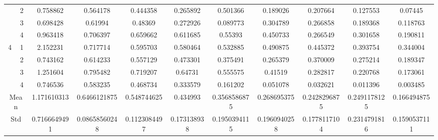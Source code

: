 \documentclass[draft,dvipsnames]{drexel-thesis}
\begin{document}
\begin{thesis}
\begin{table}[!t]
{\begin{tabular}{|c|c|c|c|c|c|c|c|c|c|c|}
                      & 2                   & 0.758862     & 0.564178      & 0.444358     & 0.265892    & 0.501366     & 0.189026     & 0.207664     & 0.127553     & 0.07445      \\ \cline{2-11}
                      & 3                   & 0.698428     & 0.61994       & 0.48369      & 0.272926    & 0.089773     & 0.304789     & 0.266858     & 0.189368     & 0.118763     \\ \cline{2-11}
                      & 4                   & 0.963418     & 0.706397      & 0.659662     & 0.611685    & 0.55393      & 0.450733     & 0.266549     & 0.301658     & 0.190811     \\ \hline
\multirow{4}{*}{4}    & 1                   & 2.152231     & 0.717714      & 0.595703     & 0.580464    & 0.532885     & 0.490875     & 0.445372     & 0.393754     & 0.344004     \\ \cline{2-11}
                      & 2                   & 0.743162     & 0.614233      & 0.557129     & 0.473301    & 0.375491     & 0.265379     & 0.370009     & 0.275214     & 0.189347     \\ \cline{2-11}
                      & 3                   & 1.251604     & 0.795482      & 0.719207     & 0.64731     & 0.555575     & 0.41519      & 0.282817     & 0.220768     & 0.173061     \\ \cline{2-11}
                      & 4                   & 0.746536     & 0.583235      & 0.468734     & 0.333579    & 0.161202     & 0.051078     & 0.032621     & 0.011396     & 0.003485     \\ \hline
\multicolumn{2}{|c|}{Mean}                  & 1.171610313  & 0.6466121875  & 0.548744625  & 0.434993    & 0.3568586875 & 0.268695375  & 0.2428296875 & 0.2491178125 & 0.166494875  \\ \hline
\multicolumn{2}{|c|}{Std}                   & 0.7166649491 & 0.08658560248 & 0.1123084497 & 0.173138938 & 0.1950394115 & 0.1960940258 & 0.1778117104 & 0.2314791816 & 0.1590537111 \\ \hline
\end{tabular}}
\end{table}


\end{thesis}
\end{document}
